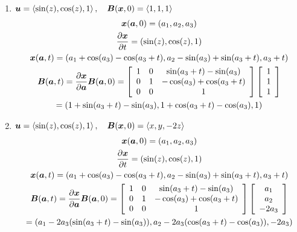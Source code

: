 \documentclass{article}
\begin{document}
\begin{enumerate}
    \item $\boldsymbol{u} = \left< \sin(z), \cos(z), 1\right>, \quad \boldsymbol{B}(\boldsymbol{x},0) = \left< 1,
    1, 1\right>$
    \begin{gather*}
        \boldsymbol{x}(\boldsymbol{a}, 0) = \left(a_1, a_2, a_3\right)\\
        \frac{\partial \boldsymbol{x}}{\partial t} = \left(\sin(z), \cos(z), 1\right)\\
        \boldsymbol{x}(\boldsymbol{a},t) = \left(a_1 + \cos(a_3) - \cos(a_3 + t), a_2 - \sin(a_3) + \sin(a_3 +
        t), a_3 + t\right)\\
        \boldsymbol{B}(\boldsymbol{a},t) = \frac{\partial \boldsymbol{x}}{\partial \boldsymbol{a}}\boldsymbol{B}(\boldsymbol{a},0)
        = \left[\begin{array}{c c c}
        1 & 0 &\sin(a_3 + t) - \sin(a_3) \\
        0 & 1 & -\cos(a_3) + \cos(a_3+t) \\
        0 & 0 & 1\end{array}\right] \left[\begin{array}{c}
        1\\1\\1\end{array}\right] \\= \left(1 + \sin(a_3+t)-\sin(a_3), 1 +
        \cos(a_3+t) - \cos(a_3), 1\right)
    \end{gather*}
    \item $\boldsymbol{u} = \left< \sin(z), \cos(z), 1\right>, \quad \boldsymbol{B}(\boldsymbol{x},0) = \left< x,
    y, -2z\right>$
    \begin{gather*}
        \x(\bs{a}, 0) = \left(a_1, a_2, a_3\right)\\
        \ppt{\x} = \left(\sin(z), \cos(z), 1\right)\\
        \x(\bs{a},t) = \left(a_1 + \cos(a_3) - \cos(a_3 + t), a_2 - \sin(a_3) + \sin(a_3 +
        t), a_3 + t\right)\\
        \B(\bs{a},t) = \pp{\x}{\bs{a}}\B(\bs{a},0)
        = \left[\begin{array}{c c c}
        1 & 0 &\sin(a_3 + t) - \sin(a_3) \\
        0 & 1 & -\cos(a_3) + \cos(a_3+t) \\
        0 & 0 & 1\end{array}\right]\left[\begin{array}{c}
        a_1\\a_2\\-2a_3\end{array}\right]\\ = \left(a_1 -
        2a_3(\sin(a_3+t)-\sin(a_3)), a_2 -2a_3(
        \cos(a_3+t) - \cos(a_3)), -2a_3\right)

\end{gather*}
\end{enumerate}
\end{document}
